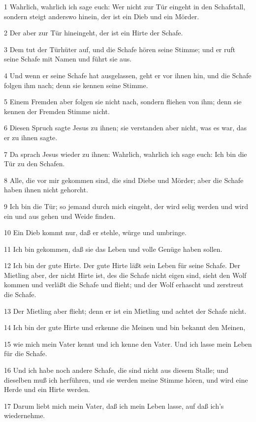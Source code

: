 \par 1 Wahrlich, wahrlich ich sage euch: Wer nicht zur Tür eingeht in den Schafstall, sondern steigt anderswo hinein, der ist ein Dieb und ein Mörder.
\par 2 Der aber zur Tür hineingeht, der ist ein Hirte der Schafe.
\par 3 Dem tut der Türhüter auf, und die Schafe hören seine Stimme; und er ruft seine Schafe mit Namen und führt sie aus.
\par 4 Und wenn er seine Schafe hat ausgelassen, geht er vor ihnen hin, und die Schafe folgen ihm nach; denn sie kennen seine Stimme.
\par 5 Einem Fremden aber folgen sie nicht nach, sondern fliehen von ihm; denn sie kennen der Fremden Stimme nicht.
\par 6 Diesen Spruch sagte Jesus zu ihnen; sie verstanden aber nicht, was es war, das er zu ihnen sagte.
\par 7 Da sprach Jesus wieder zu ihnen: Wahrlich, wahrlich ich sage euch: Ich bin die Tür zu den Schafen.
\par 8 Alle, die vor mir gekommen sind, die sind Diebe und Mörder; aber die Schafe haben ihnen nicht gehorcht.
\par 9 Ich bin die Tür; so jemand durch mich eingeht, der wird selig werden und wird ein und aus gehen und Weide finden.
\par 10 Ein Dieb kommt nur, daß er stehle, würge und umbringe.
\par 11 Ich bin gekommen, daß sie das Leben und volle Genüge haben sollen.
\par 12 Ich bin der gute Hirte. Der gute Hirte läßt sein Leben für seine Schafe. Der Mietling aber, der nicht Hirte ist, des die Schafe nicht eigen sind, sieht den Wolf kommen und verläßt die Schafe und flieht; und der Wolf erhascht und zerstreut die Schafe.
\par 13 Der Mietling aber flieht; denn er ist ein Mietling und achtet der Schafe nicht.
\par 14 Ich bin der gute Hirte und erkenne die Meinen und bin bekannt den Meinen,
\par 15 wie mich mein Vater kennt und ich kenne den Vater. Und ich lasse mein Leben für die Schafe.
\par 16 Und ich habe noch andere Schafe, die sind nicht aus diesem Stalle; und dieselben muß ich herführen, und sie werden meine Stimme hören, und wird eine Herde und ein Hirte werden.
\par 17 Darum liebt mich mein Vater, daß ich mein Leben lasse, auf daß ich's wiedernehme.
